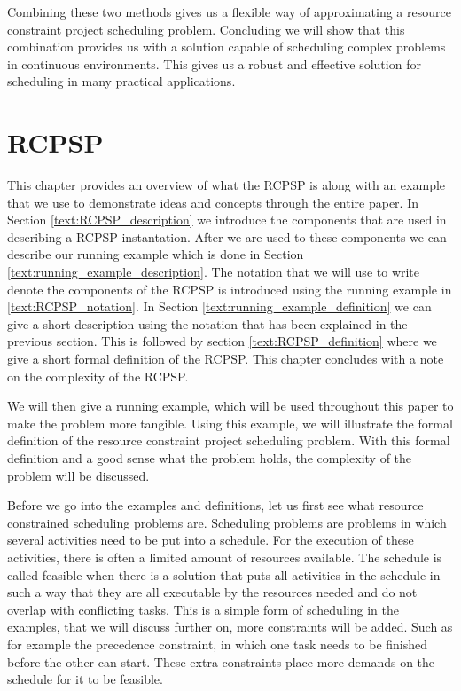 \documentclass{article}
\theoremstyle{definition}
\begin{document}
Combining these two methods gives us a flexible way of approximating a resource constraint project scheduling problem.
Concluding we will show that this combination provides us with a solution capable of scheduling complex problems in continuous environments.
This gives us a robust and effective solution for scheduling in many practical applications.

\newpage

\section{RCPSP}
\label{text:RCPSP}

This chapter provides an overview of what the RCPSP is along with an example that we use to demonstrate ideas and concepts through the entire paper. 
In Section \ref{text:RCPSP_description} we introduce the components that are used in describing a RCPSP instantation. After we are used to these components we can describe our running example which is done in Section  \ref{text:running_example_description}. The notation that we will use to write denote the components of the RCPSP is introduced using the running example in \ref{text:RCPSP_notation}. In Section \ref{text:running_example_definition} we can give a short description using the notation that has been explained in the previous section. This is followed by section \ref{text:RCPSP_definition} where we give a short formal definition of the RCPSP. This chapter concludes with a note on the complexity of the RCPSP. 

We will then give a running example, which will be used throughout this paper to make the problem more tangible.
Using this example, we will illustrate the formal definition of the resource constraint project scheduling problem.
With this formal definition and a good sense what the problem holds, the complexity of the problem will be discussed.

Before we go into the examples and definitions, let us first see what resource constrained scheduling problems are.
Scheduling problems are problems in which several activities need to be put into a schedule.
For the execution of these activities, there is often a limited amount of resources available.
The schedule is called feasible when there is a solution that puts all activities in the schedule in such a way that they are all executable by the resources needed and do not overlap with conflicting tasks.
This is a simple form of scheduling in the examples, that we will discuss further on, more constraints will be added.
Such as for example the precedence constraint, in which one task needs to be finished before the other can start.
These extra constraints place more demands on the schedule for it to be feasible.
\end{document}
